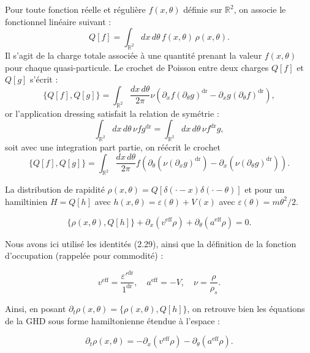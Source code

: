 Pour toute fonction réelle et régulière \( f(x, \theta) \) définie sur \( \mathbb{R}^2 \), on associe le fonctionnel linéaire suivant :
\begin{equation}
	Q[f] = \int_{\mathbb{R}^2} dx\, d\theta\, f(x, \theta)\, \rho(x, \theta).
\end{equation}
Il s'agit de la charge totale associée à une quantité prenant la valeur \( f(x, \theta) \) pour chaque quasi-particule.  Le crochet de Poisson entre deux charges \( Q[f] \) et \( Q[g]\) s’écrit :
\begin{equation}
	\{ Q[f] , Q[g] \} = \int_{\mathbb{R}^2} \frac{dx\, d\theta}{2\pi} \nu  \left( \partial_x f  (\partial_\theta g )^{\mathrm{dr}}  - \partial_x g (\partial_\theta f)^{\mathrm{dr}}  \right),
\end{equation}
or l'application dressing satisfait la relation de symétrie \cite{doyon2020lecture}:
\begin{equation}
	\int_{\mathbb{R}^2}	 dx\, d\theta \, \nu f g^{\mathrm{dr}} = \int_{\mathbb{R}^2}	 dx\, d\theta \, \nu f^{\mathrm{dr}} g,
\end{equation}
soit avec une integration part partie, on réécrit le crochet 
\begin{equation}
	\{ Q[f] , Q[g]\} = \int_{\mathbb{R}^2} \frac{dx\, d\theta}{2\pi} f  \left( \partial_\theta ( \nu   (\partial_x g )^{\mathrm{dr}} )   - \partial_x ( \nu   (\partial_\theta g )^{\mathrm{dr}} )  \right).
\end{equation}

La distribution de rapidité $\rho( x , \theta )  = Q[\delta( \cdot - x )\delta( \cdot - \theta  )  ]$ et pour un hamiltinien $H = Q[h]$ avec $h(x , \theta ) = \varepsilon(\theta) + V(x)$ avec $\varepsilon(\theta) = m \theta^2/2$.

\begin{equation}
	\{ \rho(x, \theta), Q[h] \} + \partial_x (v^{\mathrm{eff}} \rho) + \partial_\theta (a^{\mathrm{eff}} \rho) = 0.
\end{equation}

Nous avons ici utilisé les identités (2.29), ainsi que la définition de la fonction d’occupation (rappelée pour commodité) :

\begin{equation}
	v^{\mathrm{eff}} = \frac{\varepsilon'^{\mathrm{dr}}}{1^{\mathrm{dr}}}, 
	\quad 
	a^{\mathrm{eff}} = -V, 
	\quad 
	\nu = \frac{\rho}{\rho_s}.
\end{equation}

Ainsi, en posant \( \partial_t \rho(x, \theta) = \{ \rho(x, \theta), Q[h] \} \), on retrouve bien les équations de la GHD sous forme hamiltonienne étendue à l’espace :

\begin{equation}
	\partial_t \rho(x, \theta) = -\partial_x (v^{\mathrm{eff}} \rho) - \partial_\theta (a^{\mathrm{eff}} \rho).
\end{equation}













